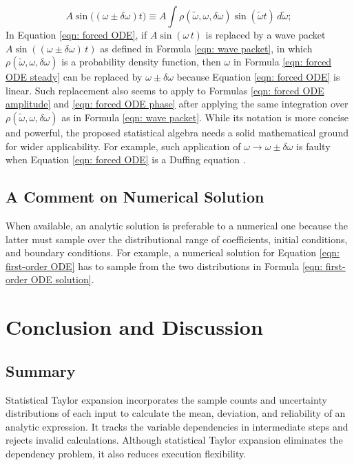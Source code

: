 \documentclass[twoside]{article}
\numberwithin{equation}{section}
\begin{document}
\begin{equation}
\label{eqn: wave packet}
A\sin\big((\omega\pm\delta\omega)t\big)  \equiv A\int \rho(\tilde{\omega}, \omega, \delta \omega) \sin(\tilde{\omega} t)\, d\tilde{\omega};
\end{equation}
In Equation \eqref{eqn: forced ODE}, if $A \sin(\omega\,t)$ is replaced by a wave packet $A \sin((\omega \pm \delta \omega)\,t)$ as defined in Formula \eqref{eqn: wave packet}, in which $\rho(\tilde{\omega}, \omega, \delta \omega)$ is a probability density function, then $\omega$ in Formula \eqref{eqn: forced ODE steady} can be replaced by $\omega \pm \delta \omega$ because Equation \eqref{eqn: forced ODE} is linear.
Such replacement also seems to apply to Formulas \eqref{eqn: forced ODE amplitude} and \eqref{eqn: forced ODE phase} after applying the same integration over $\rho(\tilde{\omega}, \omega, \delta \omega)$ as in Formula \eqref{eqn: wave packet}.
While its notation is more concise and powerful, the proposed statistical algebra needs a solid mathematical ground for wider applicability.
For example, such application of $\omega \rightarrow \omega \pm \delta \omega$ is faulty when Equation \eqref{eqn: forced ODE} is a Duffing equation  \cite{Driven_Damped_Oscillator}.


\subsection{A Comment on Numerical Solution}

When available, an analytic solution is preferable to a numerical one because the latter must sample over the distributional range of coefficients, initial conditions, and boundary conditions.
For example, a numerical solution for Equation \eqref{eqn: first-order ODE} has to sample from the two distributions in Formula \eqref{eqn: first-order ODE solution}.


\section{Conclusion and Discussion}
\label{sec: conclusion and discussion}

\subsection{Summary}

Statistical Taylor expansion incorporates the sample counts and uncertainty distributions of each input to calculate the mean, deviation, and reliability of an analytic expression. 
It tracks the variable dependencies in intermediate steps and rejects invalid calculations.
Although statistical Taylor expansion eliminates the dependency problem, it also reduces execution flexibility.
\end{document}

